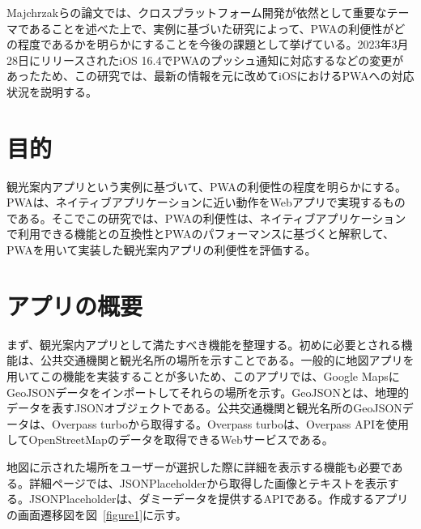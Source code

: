 \begin{multicols*}{2}
Majchrzakらの論文では、クロスプラットフォーム開発が依然として重要なテーマであることを述べた上で、実例に基づいた研究によって、PWAの利便性がどの程度であるかを明らかにすることを今後の課題として挙げている\cite{Majchrzak2018ProgressiveWebApps}。2023年3月28日にリリースされたiOS 16.4でPWAのプッシュ通知に対応するなどの変更があったため、この研究では、最新の情報を元に改めてiOSにおけるPWAへの対応状況を説明する。

\section{目的}
観光案内アプリという実例に基づいて、PWAの利便性の程度を明らかにする。PWAは、ネイティブアプリケーションに近い動作をWebアプリで実現するものである。そこでこの研究では、PWAの利便性は、ネイティブアプリケーションで利用できる機能との互換性とPWAのパフォーマンスに基づくと解釈して、PWAを用いて実装した観光案内アプリの利便性を評価する。

\section{アプリの概要}
まず、観光案内アプリとして満たすべき機能を整理する。初めに必要とされる機能は、公共交通機関と観光名所の場所を示すことである。一般的に地図アプリを用いてこの機能を実装することが多いため、このアプリでは、Google MapsにGeoJSONデータをインポートしてそれらの場所を示す。GeoJSONとは、地理的データを表すJSONオブジェクトである。公共交通機関と観光名所のGeoJSONデータは、Overpass turbo\cite{OverpassTurbo}から取得する。Overpass turboは、Overpass APIを使用してOpenStreetMapのデータを取得できるWebサービスである。

地図に示された場所をユーザーが選択した際に詳細を表示する機能も必要である。詳細ページでは、JSONPlaceholder\cite{JSONPlaceholder}から取得した画像とテキストを表示する。JSONPlaceholderは、ダミーデータを提供するAPIである。作成するアプリの画面遷移図を図~\ref{figure1}に示す。


\end{multicols*}

